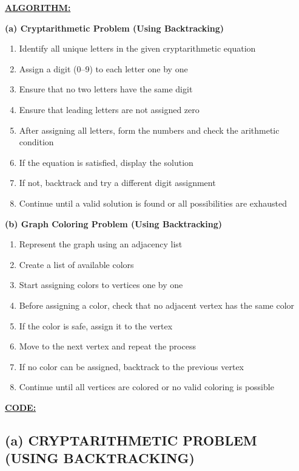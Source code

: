 \documentclass[12pt,a4paper]{article}
\begin{document}
\vspace{0.5cm}
\textbf{\underline{ALGORITHM:}}

\textbf{(a) Cryptarithmetic Problem (Using Backtracking)}
\begin{enumerate}
  \item Identify all unique letters in the given cryptarithmetic equation
  \item Assign a digit (0--9) to each letter one by one
  \item Ensure that no two letters have the same digit
  \item Ensure that leading letters are not assigned zero
  \item After assigning all letters, form the numbers and check the arithmetic condition
  \item If the equation is satisfied, display the solution
  \item If not, backtrack and try a different digit assignment
  \item Continue until a valid solution is found or all possibilities are exhausted
\end{enumerate}

\textbf{(b) Graph Coloring Problem (Using Backtracking)}
\begin{enumerate}
  \item Represent the graph using an adjacency list
  \item Create a list of available colors
  \item Start assigning colors to vertices one by one
  \item Before assigning a color, check that no adjacent vertex has the same color
  \item If the color is safe, assign it to the vertex
  \item Move to the next vertex and repeat the process
  \item If no color can be assigned, backtrack to the previous vertex
  \item Continue until all vertices are colored or no valid coloring is possible
\end{enumerate}

\vspace{0.5cm}
\textbf{\underline{CODE:}}

\subsection{(a) CRYPTARITHMETIC PROBLEM (USING BACKTRACKING)}
\end{document}

